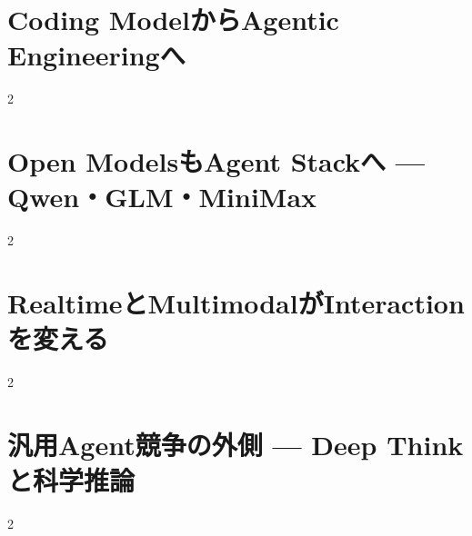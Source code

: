 \documentclass[lualatex,a4paper,11pt]{jlreq}
\begin{document}
\surveycover
\clearpage


\clearpage
\section{Coding ModelからAgentic Engineeringへ}
\label{pkg:agentic-engineering-frontier}
\vspace{0.15em}
\begin{multicols}{2}

\end{multicols}

\medskip


\Needspace{0.45\textheight}
\bigskip
\section{Open ModelsもAgent Stackへ — Qwen・GLM・MiniMax}
\label{pkg:open-model-agent-stack}
\vspace{0.15em}
\begin{multicols}{2}

\end{multicols}

\medskip


\Needspace{0.45\textheight}
\bigskip
\section{RealtimeとMultimodalがInteractionを変える}
\label{pkg:realtime-multimodal-interaction}
\vspace{0.15em}
\begin{multicols}{2}

\end{multicols}

\medskip


\Needspace{0.45\textheight}
\bigskip
\section{汎用Agent競争の外側 — Deep Thinkと科学推論}
\label{pkg:specialized-reasoning-science}
\vspace{0.15em}
\begin{multicols}{2}

\end{multicols}

\medskip

\end{document}
